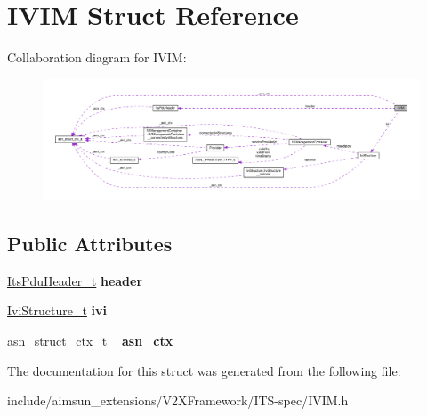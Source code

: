 \hypertarget{structIVIM}{}\section{I\+V\+IM Struct Reference}
\label{structIVIM}


Collaboration diagram for I\+V\+IM\+:\nopagebreak
\begin{figure}[H]
\begin{center}
\leavevmode
\includegraphics[width=350pt]{structIVIM__coll__graph}
\end{center}
\end{figure}
\subsection*{Public Attributes}
\begin{DoxyCompactItemize}
\item 
\hyperlink{structItsPduHeader}{Its\+Pdu\+Header\+\_\+t} {\bfseries header}\hypertarget{structIVIM_a9c893fd5a2e308b6b8ef7d7bd665d472}{}\label{structIVIM_a9c893fd5a2e308b6b8ef7d7bd665d472}

\item 
\hyperlink{structIviStructure}{Ivi\+Structure\+\_\+t} {\bfseries ivi}\hypertarget{structIVIM_af822e65060b52c95e3278ba64e50c340}{}\label{structIVIM_af822e65060b52c95e3278ba64e50c340}

\item 
\hyperlink{structasn__struct__ctx__s}{asn\+\_\+struct\+\_\+ctx\+\_\+t} {\bfseries \+\_\+asn\+\_\+ctx}\hypertarget{structIVIM_ae7b56f2ad791d496246f02b1550740fa}{}\label{structIVIM_ae7b56f2ad791d496246f02b1550740fa}

\end{DoxyCompactItemize}


The documentation for this struct was generated from the following file\+:\begin{DoxyCompactItemize}
\item 
include/aimsun\+\_\+extensions/\+V2\+X\+Framework/\+I\+T\+S-\/spec/I\+V\+I\+M.\+h\end{DoxyCompactItemize}
